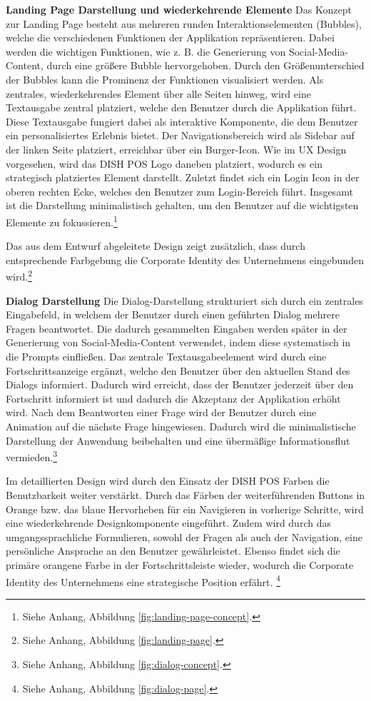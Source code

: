 \textbf{Landing Page Darstellung und wiederkehrende Elemente}\newline
Das Konzept zur Landing Page besteht aus mehreren runden Interaktionselementen (Bubbles), welche die verschiedenen Funktionen der Applikation repräsentieren.
Dabei werden die wichtigen Funktionen, wie z. B. die Generierung von Social-Media-Content, durch eine größere Bubble hervorgehoben.
Durch den Größenunterschied der Bubbles kann die Prominenz der Funktionen visualisiert werden.
Als zentrales, wiederkehrendes Element über alle Seiten hinweg, wird eine Textausgabe zentral platziert, welche den Benutzer durch die Applikation führt.
Diese Textausgabe fungiert dabei als interaktive Komponente, die dem Benutzer ein personalisiertes Erlebnis bietet.
Der Navigationsbereich wird als Sidebar auf der linken Seite platziert, erreichbar über ein Burger-Icon.
Wie im \ac{UX} Design vorgesehen, wird das DISH POS Logo daneben platziert, wodurch es ein strategisch platziertes Element darstellt.
Zuletzt findet sich ein Login Icon in der oberen rechten Ecke, welches den Benutzer zum Login-Bereich führt.
Insgesamt ist die Darstellung minimalistisch gehalten, um den Benutzer auf die wichtigsten Elemente zu fokussieren.\footnote{Siehe Anhang, Abbildung \ref{fig:landing-page-concept}.}

Das aus dem Entwurf abgeleitete Design zeigt zusätzlich, dass durch entsprechende Farbgebung die Corporate Identity des Unternehmens eingebunden wird.\footnote{Siehe Anhang, Abbildung \ref{fig:landing-page}.}

\textbf{Dialog Darstellung}\newline
Die Dialog-Darstellung strukturiert sich durch ein zentrales Eingabefeld, in welchem der Benutzer durch einen geführten Dialog mehrere Fragen beantwortet.
Die dadurch gesammelten Eingaben werden später in der Generierung von Social-Media-Content verwendet, indem diese systematisch in die Prompts einfließen.
Das zentrale Textausgabeelement wird durch eine Fortschrittsanzeige ergänzt, welche den Benutzer über den aktuellen Stand des Dialogs informiert.
Dadurch wird erreicht, dass der Benutzer jederzeit über den Fortschritt informiert ist und dadurch die Akzeptanz der Applikation erhöht wird.
Nach dem Beantworten einer Frage wird der Benutzer durch eine Animation auf die nächste Frage hingewiesen.
Dadurch wird die minimalistische Darstellung der Anwendung beibehalten und eine übermäßige Informationsflut vermieden.\footnote{Siehe Anhang, Abbildung \ref{fig:dialog-concept}.}

Im detaillierten Design wird durch den Einsatz der DISH POS Farben die Benutzbarkeit weiter verstärkt.
Durch das Färben der weiterführenden Buttons in Orange bzw. das blaue Hervorheben für ein Navigieren in vorherige Schritte, wird eine wiederkehrende Designkomponente eingeführt.
Zudem wird durch das umgangssprachliche Formulieren, sowohl der Fragen als auch der Navigation, eine persönliche Ansprache an den Benutzer gewährleistet.
Ebenso findet sich die primäre orangene Farbe in der Fortschrittsleiste wieder, wodurch die Corporate Identity des Unternehmens eine strategische Position erfährt. \footnote{Siehe Anhang, Abbildung \ref{fig:dialog-page}.}

